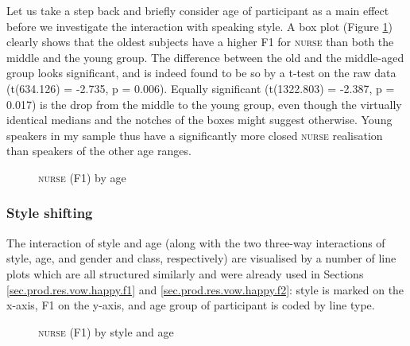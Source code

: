 Let us take a step back and briefly consider age of participant as a main effect before we investigate the interaction with speaking style.
A box plot (Figure \ref{fig.box.f1.nurse.tot}) clearly shows that the oldest subjects have a higher F1 for \textsc{nurse} than both the middle and the young group.
The difference between the old and the middle-aged group looks significant, and is indeed found to be so by a t-test on the raw data (t(634.126) = -2.735, p = 0.006).
Equally significant (t(1322.803) = -2.387, p = 0.017) is the drop from the middle to the young group, even though the virtually identical medians and the notches of the boxes might suggest otherwise.
Young speakers in my sample thus have a significantly more closed \textsc{nurse} realisation than speakers of the other age ranges.

\begin{figure}[h!]
	\centering
		\resizebox{0.5\linewidth}{!}{} 
	\caption{\textsc{nurse} (F1) by age}
	\label{fig.box.f1.nurse.tot}
\end{figure}

\subsubsection{Style shifting}
\label{sec.prod.res.vow.nurse.f1.shifting}

The interaction of style and age (along with the two three-way interactions of style, age, and gender and class, respectively) are visualised by a number of line plots which are all structured similarly and were already used in Sections \ref{sec.prod.res.vow.happy.f1} and \ref{sec.prod.res.vow.happy.f2}: style is marked on the x-axis, F1 on the y-axis, and age group of participant is coded by line type.

\begin{figure}[h!]
	\centering
		\resizebox{0.5\linewidth}{!}{} 
	\caption{\textsc{nurse} (F1) by style and age}
	\label{fig.line.f1.nurse.tot}
\end{figure}

